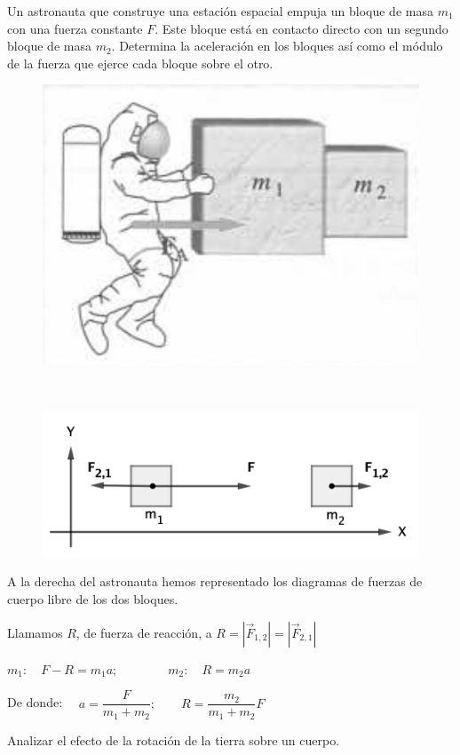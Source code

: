 \begin{prob}
Un astronauta que construye una estación espacial empuja un bloque de masa $m_1$ con una fuerza constante $F$. Este bloque está en contacto directo con un segundo bloque de masa $m_2$. Determina la aceleración en los bloques así como el módulo de la fuerza que ejerce cada bloque sobre el otro.	
\end{prob}

\vspace{30mm} %
\begin{multicols}{2}
\begin{figure}[H]
	\centering
	\includegraphics[width=.5\textwidth]{imagenes/imagenes03/T03IM59.png}
	\end{figure}
$\quad$
\begin{figure}[H]
	\centering
	\includegraphics[width=.5\textwidth]{imagenes/imagenes03/T03IM60.png}
	\end{figure}
\end{multicols}	

A la derecha del astronauta hemos representado los diagramas de fuerzas de cuerpo libre de los dos bloques.

Llamamos $R$, de fuerza de reacción, a $R=|\vec F_{1,2}|=|\vec F_{2,1}|$

$m_1: \quad F-R=m_1 a; \qquad \qquad m_2: \quad R=m_2 a$

De donde: $\quad a=\dfrac{F}{m_1+m_2};\qquad R=\dfrac{m_2}{m_1+m_2}F$



\begin{prob}
Analizar el efecto de la rotación de la tierra sobre un cuerpo.
\end{prob}

